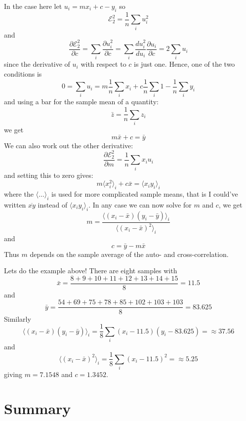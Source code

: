 \documentclass[12pt]{article}
\begin{document}
In the case here let $u_i=mx_i+c-y_i$ so
\begin{equation}
\mathcal{E}_2^2=\frac{1}{n}\sum_iu_i^2
\end{equation}
and
\begin{equation}
\frac{\partial \mathcal{E}_2^2}{\partial c}=\sum_i\frac{\partial u_i^2}{\partial c}=\sum_i\frac{d u_i^2}{du_i}\frac{\partial u_i}{\partial c}=2\sum_i u_i
\end{equation}
since the derivative of $u_i$ with respect to $c$ is just one. Hence,
one of the two conditions is
\begin{equation}
0=\sum_i u_i = m\frac{1}{n}\sum_i x_i + c\frac{1}{n}\sum_i 1-\frac{1}{n}\sum_i y_i
\end{equation}
and using a bar for the sample mean of a quantity:
\begin{equation}
\bar{z}=\frac{1}{n}\sum_i z_i
\end{equation}
we get
\begin{equation}
m\bar{x}+c=\bar{y}
\end{equation}
We can also work out the other derivative:
\begin{equation}
\frac{\partial \mathcal{E}_2^2}{\partial m}=\frac{1}{n}\sum_i x_iu_i
\end{equation}
and setting this to zero gives:
\begin{equation}
 m\langle x_i^2\rangle_i +c\bar{x}=\langle x_iy_i\rangle_i
\end{equation}
where the $\langle\ldots\rangle_i$ is used for more complicated sample
means, that is I could've written $\overline{xy}$ instead of $\langle
x_iy_i\rangle_i$. In any case we can now solve for $m$ and $c$, we get
\begin{equation}
m=\frac{\langle (x_i-\bar{x})(y_i-\bar{y})\rangle_i}{\langle (x_i-\bar{x})^2\rangle_i}
\end{equation}
and
\begin{equation}
c=\bar{y}-m\bar{x}
\end{equation}
Thus $m$ depends on the sample average of the auto- and cross-correlation.

Lets do the example above! There are eight samples with
\begin{equation}
\bar{x}=\frac{8+9+10+11+12+13+14+15}{8}=11.5
\end{equation}
and
\begin{equation}
\bar{y}=\frac{54 + 69 + 75 + 78 + 85 + 102 + 103 + 103}{8}=83.625
\end{equation}
Similarly
\begin{equation}
\langle (x_i-\bar{x})(y_i-\bar{y})\rangle_i=\frac{1}{8}\sum_i(x_i-11.5)(y_i-83.625)=\approx 37.56
\end{equation}
and
\begin{equation}
\langle (x_i-\bar{x})^2\rangle_i=\frac{1}{8}\sum_i(x_i-11.5)^2=\approx 5.25
\end{equation}
giving $m=7.1548$ and $c=1.3452$.
\section*{Summary}
\end{document}
